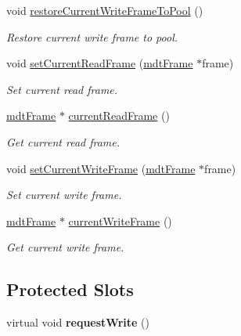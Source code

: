 \begin{DoxyCompactItemize}
void \hyperlink{classmdt_port_thread_helper_a08f1395dda714880d62a24687821eba1}{restoreCurrentWriteFrameToPool} ()
\begin{DoxyCompactList}\small\item\em Restore current write frame to pool. \end{DoxyCompactList}\item 
\hypertarget{classmdt_port_thread_helper_aff19dfb54051f097ed73384eae92bf45}{
void \hyperlink{classmdt_port_thread_helper_aff19dfb54051f097ed73384eae92bf45}{setCurrentReadFrame} (\hyperlink{classmdt_frame}{mdtFrame} $\ast$frame)}
\label{classmdt_port_thread_helper_aff19dfb54051f097ed73384eae92bf45}

\begin{DoxyCompactList}\small\item\em Set current read frame. \end{DoxyCompactList}\item 
\hyperlink{classmdt_frame}{mdtFrame} $\ast$ \hyperlink{classmdt_port_thread_helper_a36445798b093f4e7463c353677d816d5}{currentReadFrame} ()
\begin{DoxyCompactList}\small\item\em Get current read frame. \end{DoxyCompactList}\item 
\hypertarget{classmdt_port_thread_helper_a28aaafda955c9975309ba81c32a61bfa}{
void \hyperlink{classmdt_port_thread_helper_a28aaafda955c9975309ba81c32a61bfa}{setCurrentWriteFrame} (\hyperlink{classmdt_frame}{mdtFrame} $\ast$frame)}
\label{classmdt_port_thread_helper_a28aaafda955c9975309ba81c32a61bfa}

\begin{DoxyCompactList}\small\item\em Set current write frame. \end{DoxyCompactList}\item 
\hyperlink{classmdt_frame}{mdtFrame} $\ast$ \hyperlink{classmdt_port_thread_helper_a7b7f97c9add6cc0344cb674804ac584d}{currentWriteFrame} ()
\begin{DoxyCompactList}\small\item\em Get current write frame. \end{DoxyCompactList}\end{DoxyCompactItemize}
\subsection*{Protected Slots}
\begin{DoxyCompactItemize}
\item 
\hypertarget{classmdt_port_thread_helper_a115ff95797925d444835e33a36f44102}{
virtual void {\bfseries requestWrite} ()}
\label{classmdt_port_thread_helper_a115ff95797925d444835e33a36f44102}

\end{DoxyCompactItemize}
